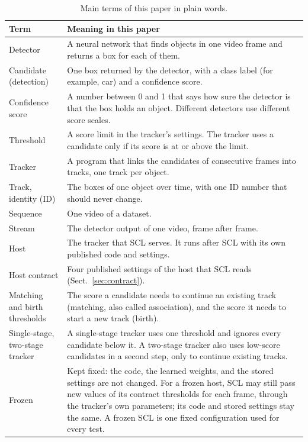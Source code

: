 \documentclass[pdflatex,sn-mathphys-num,iicol]{sn-jnl}
\newcommand{\scl}{SCL}
\begin{document}
\begin{table}[t]
\caption{Main terms of this paper in plain words.}
\label{tab:terms}
\centering\footnotesize
\setlength{\tabcolsep}{4pt}
\renewcommand{\arraystretch}{1.15}
\begin{tabular}{@{}>{\raggedright\arraybackslash}p{32mm}>{\raggedright\arraybackslash}p{123mm}@{}}
\toprule
Term & Meaning in this paper\\
\midrule
Detector & A neural network that finds objects in one video frame and returns a box for each of them.\\
Candidate (detection) & One box returned by the detector, with a class label (for example, car) and a confidence score.\\
Confidence score & A number between 0 and 1 that says how sure the detector is that the box holds an object. Different detectors use different score scales.\\
Threshold & A score limit in the tracker's settings. The tracker uses a candidate only if its score is at or above the limit.\\
Tracker & A program that links the candidates of consecutive frames into tracks, one track per object.\\
Track, identity (ID) & The boxes of one object over time, with one ID number that should never change.\\
Sequence & One video of a dataset.\\
Stream & The detector output of one video, frame after frame.\\
Host & The tracker that \scl{} serves. It runs after \scl{} with its own published code and settings.\\
Host contract & Four published settings of the host that \scl{} reads (Sect.~\ref{sec:contract}).\\
Matching and birth thresholds & The score a candidate needs to continue an existing track (matching, also called association), and the score it needs to start a new track (birth).\\
Single-stage, two-stage tracker & A single-stage tracker uses one threshold and ignores every candidate below it. A two-stage tracker also uses low-score candidates in a second step, only to continue existing tracks.\\
Frozen & Kept fixed: the code, the learned weights, and the stored settings are not changed. For a frozen host, \scl{} may still pass new values of its contract thresholds for each frame, through the tracker's own parameters; its code and stored settings stay the same. A frozen \scl{} is one fixed configuration used for every test.\\

\end{tabular}
\end{table}
\end{document}
